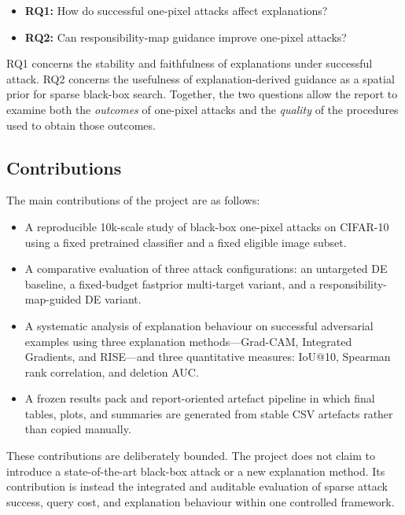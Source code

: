 \begin{itemize}
  \item \textbf{RQ1:} How do successful one-pixel attacks affect explanations?
  \item \textbf{RQ2:} Can responsibility-map guidance improve one-pixel attacks?
\end{itemize}

RQ1 concerns the stability and faithfulness of explanations under successful attack.
RQ2 concerns the usefulness of explanation-derived guidance as a spatial prior for sparse black-box search.
Together, the two questions allow the report to examine both the \emph{outcomes} of one-pixel attacks and the \emph{quality} of the procedures used to obtain those outcomes.

\subsection{Contributions}
The main contributions of the project are as follows:
\begin{itemize}
  \item A reproducible 10k-scale study of black-box one-pixel attacks on CIFAR-10 using a fixed pretrained classifier and a fixed eligible image subset.
  \item A comparative evaluation of three attack configurations: an untargeted DE baseline, a fixed-budget fastprior multi-target variant, and a responsibility-map-guided DE variant.
  \item A systematic analysis of explanation behaviour on successful adversarial examples using three explanation methods---Grad-CAM, Integrated Gradients, and RISE---and three quantitative measures: IoU@10, Spearman rank correlation, and deletion AUC.
  \item A frozen results pack and report-oriented artefact pipeline in which final tables, plots, and summaries are generated from stable CSV artefacts rather than copied manually.
\end{itemize}

These contributions are deliberately bounded.
The project does not claim to introduce a state-of-the-art black-box attack or a new explanation method.
Its contribution is instead the integrated and auditable evaluation of sparse attack success, query cost, and explanation behaviour within one controlled framework.

